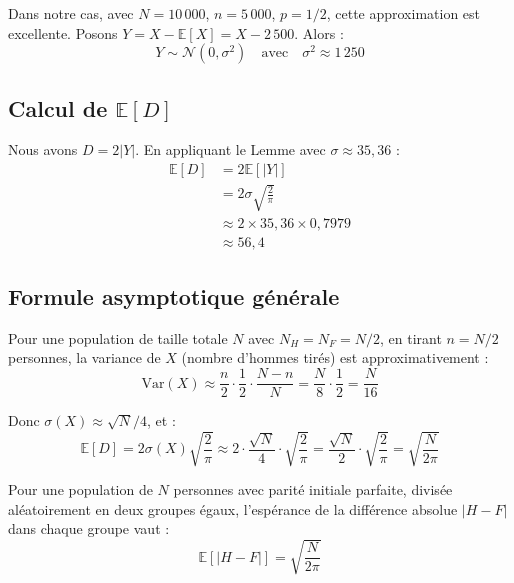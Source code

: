 \documentclass[11pt,a4paper]{article}
\theoremstyle{definition}
\theoremstyle{remark}
\begin{document}
Dans notre cas, avec $N = 10\,000$, $n = 5\,000$, $p = 1/2$, cette approximation est excellente. Posons $Y = X - \mathbb{E}[X] = X - 2\,500$. Alors :
\begin{equation}
Y \sim \mathcal{N}(0, \sigma^2) \quad \text{avec} \quad \sigma^2 \approx 1\,250
\end{equation}

\subsection{Calcul de $\mathbb{E}[D]$}

Nous avons $D = 2|Y|$. En appliquant le Lemme avec $\sigma \approx 35{,}36$ :
\begin{align}
\mathbb{E}[D] &= 2 \mathbb{E}[|Y|]\\
&= 2 \sigma \sqrt{\frac{2}{\pi}}\\
&\approx 2 \times 35{,}36 \times 0{,}7979\\
&\approx 56{,}4
\end{align}

\subsection{Formule asymptotique générale}

Pour une population de taille totale $N$ avec $N_H = N_F = N/2$, en tirant $n = N/2$ personnes, la variance de $X$ (nombre d'hommes tirés) est approximativement :
\begin{equation}
\text{Var}(X) \approx \frac{n}{2} \cdot \frac{1}{2} \cdot \frac{N-n}{N} = \frac{N}{8} \cdot \frac{1}{2} = \frac{N}{16}
\end{equation}

Donc $\sigma(X) \approx \sqrt{N}/4$, et :
\begin{equation}
\mathbb{E}[D] = 2\sigma(X) \sqrt{\frac{2}{\pi}} \approx 2 \cdot \frac{\sqrt{N}}{4} \cdot \sqrt{\frac{2}{\pi}} = \frac{\sqrt{N}}{2} \cdot \sqrt{\frac{2}{\pi}} = \sqrt{\frac{N}{2\pi}}
\end{equation}

\begin{tcolorbox}[colback=secondcolor!10,colframe=secondcolor,title=Résultat final]
Pour une population de $N$ personnes avec parité initiale parfaite, divisée aléatoirement en deux groupes égaux, l'espérance de la différence absolue $|H - F|$ dans chaque groupe vaut :
\begin{equation}
\boxed{\mathbb{E}[|H - F|] = \sqrt{\frac{N}{2\pi}}}
\end{equation}
\end{tcolorbox}
\end{document}
